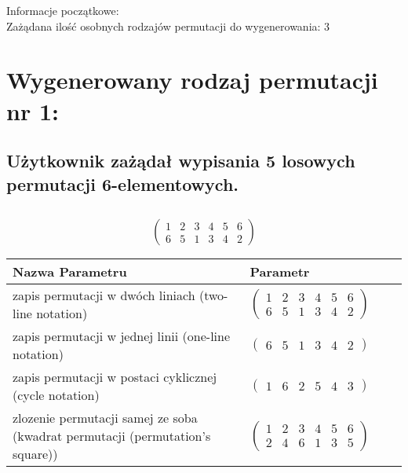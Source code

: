 \documentclass[12pt]{article}
\begin{document}
 
\begin{flushleft}
Informacje początkowe:\\[\baselineskip]
Zażądana ilość osobnych rodzajów permutacji do wygenerowania: 3
\end{flushleft}
\hfill
\section{Wygenerowany rodzaj permutacji nr 1:}
\subsection*{Użytkownik zażądał wypisania 5 losowych permutacji 6-elementowych.}

\subsection{}
\begin{center}
\[
\begin{pmatrix}
	1 & 2 & 3 & 4 & 5 & 6 \\ 
	6 & 5 & 1 & 3 & 4 & 2 
\end{pmatrix}
\]

\begin{tabular}{|m{0.6\linewidth}|m{0.4\linewidth}|}
	\hline
	Nazwa Parametru & Parametr \\
	\hline
	zapis permutacji w dwóch liniach (two-line notation) & $\begin{pmatrix} 1 & 2 & 3 & 4 & 5 & 6 \\ 
6 & 5 & 1 & 3 & 4 & 2 \end{pmatrix}$ \\ 
	\hline
	zapis permutacji w jednej linii (one-line notation) & $\begin{pmatrix} 6 & 5 & 1 & 3 & 4 & 2 \end{pmatrix}$ \\ 
	\hline
	zapis permutacji w postaci cyklicznej (cycle notation) & $\begin{pmatrix} 1 & 6 & 2 & 5 & 4 & 3 \end{pmatrix} $ \\ 
	\hline
	zlozenie permutacji samej ze soba (kwadrat permutacji (permutation's square)) & $\begin{pmatrix} 1 & 2 & 3 & 4 & 5 & 6 \\ 
2 & 4 & 6 & 1 & 3 & 5 \end{pmatrix}$ \\ 
	\hline
\end{tabular}
\end{center}
\end{document}
